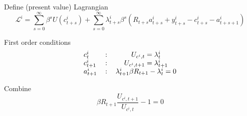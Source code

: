 \documentclass[notes=show]{beamer}
\begin{document}
\begin{frame}%


Define (present value) Lagrangian%
\begin{equation*}
\mathcal{L}^{i}=\underset{s=0}{\overset{\infty }{\sum }}\beta
^{s}U(c_{t+s}^{i})+\underset{s=0}{\overset{\infty }{\sum }}\lambda
_{t+s}^{i}\beta ^{s}\left(
R_{t+s}a_{t+s}^{i}+y_{t+s}^{i}-c_{t+s}^{i}-a_{t+s+1}^{i}\right)
\end{equation*}

First order conditions 
\begin{equation*}
\begin{tabular}{llc}
$c_{t}^{i}$ & : & $U_{c^{i},t}=\lambda _{t}^{i}$ \\ 
$c_{t+1}^{i}$ & : & $U_{c^{i},t+1}=\lambda _{t+1}^{i}$ \\ 
$a_{t+1}^{i}$ & : & $\lambda _{t+1}^{i}\beta R_{t+1}-\lambda _{t}^{i}=0$%
\end{tabular}%
\end{equation*}

Combine%
\begin{equation*}
\beta R_{t+1}\frac{U_{c^{i},t+1}}{U_{c^{i},t}}-1=0
\end{equation*}

\transboxout%
\end{frame}%
\end{document}
